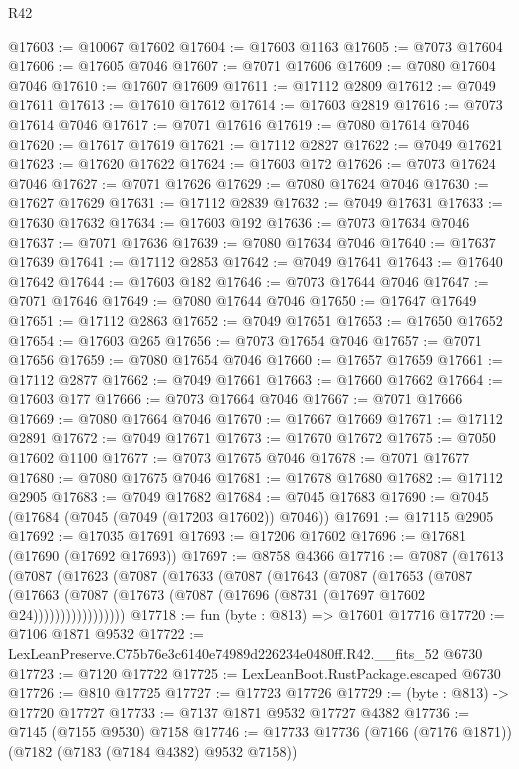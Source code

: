 \begin{lexlean}{R42}
\begin{coremodule}
{@17603 := @10067 @17602
@17604 := @17603 @1163
@17605 := @7073 @17604
@17606 := @17605 @7046
@17607 := @7071 @17606
@17609 := @7080 @17604 @7046
@17610 := @17607 @17609
@17611 := @17112 @2809
@17612 := @7049 @17611
@17613 := @17610 @17612
@17614 := @17603 @2819
@17616 := @7073 @17614 @7046
@17617 := @7071 @17616
@17619 := @7080 @17614 @7046
@17620 := @17617 @17619
@17621 := @17112 @2827
@17622 := @7049 @17621
@17623 := @17620 @17622
@17624 := @17603 @172
@17626 := @7073 @17624 @7046
@17627 := @7071 @17626
@17629 := @7080 @17624 @7046
@17630 := @17627 @17629
@17631 := @17112 @2839
@17632 := @7049 @17631
@17633 := @17630 @17632
@17634 := @17603 @192
@17636 := @7073 @17634 @7046
@17637 := @7071 @17636
@17639 := @7080 @17634 @7046
@17640 := @17637 @17639
@17641 := @17112 @2853
@17642 := @7049 @17641
@17643 := @17640 @17642
@17644 := @17603 @182
@17646 := @7073 @17644 @7046
@17647 := @7071 @17646
@17649 := @7080 @17644 @7046
@17650 := @17647 @17649
@17651 := @17112 @2863
@17652 := @7049 @17651
@17653 := @17650 @17652
@17654 := @17603 @265
@17656 := @7073 @17654 @7046
@17657 := @7071 @17656
@17659 := @7080 @17654 @7046
@17660 := @17657 @17659
@17661 := @17112 @2877
@17662 := @7049 @17661
@17663 := @17660 @17662
@17664 := @17603 @177
@17666 := @7073 @17664 @7046
@17667 := @7071 @17666
@17669 := @7080 @17664 @7046
@17670 := @17667 @17669
@17671 := @17112 @2891
@17672 := @7049 @17671
@17673 := @17670 @17672
@17675 := @7050 @17602 @1100
@17677 := @7073 @17675 @7046
@17678 := @7071 @17677
@17680 := @7080 @17675 @7046
@17681 := @17678 @17680
@17682 := @17112 @2905
@17683 := @7049 @17682
@17684 := @7045 @17683
@17690 := @7045 (@17684 (@7045 (@7049 (@17203 @17602)) @7046))
@17691 := @17115 @2905
@17692 := @17035 @17691
@17693 := @17206 @17602
@17696 := @17681 (@17690 (@17692 @17693))
@17697 := @8758 @4366
@17716 := @7087
    (@17613
      (@7087
        (@17623
          (@7087
            (@17633
              (@7087
                (@17643
                  (@7087
                    (@17653
                      (@7087
                        (@17663
                          (@7087 (@17673 (@7087 (@17696 (@8731 (@17697 @17602 @24)))))))))))))))))
@17718 := fun (byte : @813) => @17601 @17716
@17720 := @7106 @1871 @9532
@17722 := LexLeanPreserve.C75b76e3c6140e74989d226234e0480ff.R42.__fits_52 @6730
@17723 := @7120 @17722
@17725 := LexLeanBoot.RustPackage.escaped @6730
@17726 := @810 @17725
@17727 := @17723 @17726
@17729 := (byte : @813) -> @17720 @17727
@17733 := @7137 @1871 @9532 @17727 @4382
@17736 := @7145 (@7155 @9530) @7158
@17746 := @17733 @17736 (@7166 (@7176 @1871)) (@7182 (@7183 (@7184 @4382) @9532 @7158))
}
\end{coremodule}
\end{lexlean}
